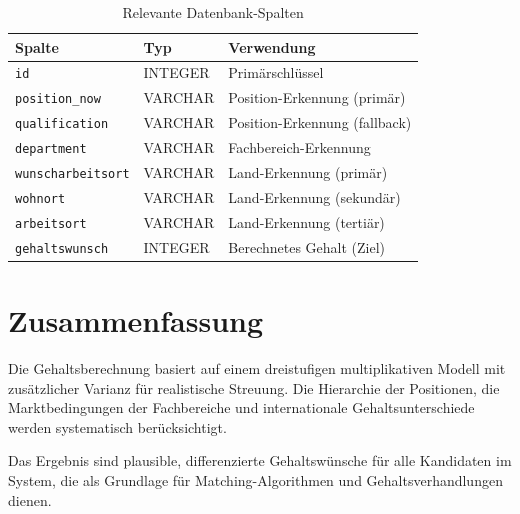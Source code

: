 \documentclass[12pt,a4paper]{article}
\begin{document}
\begin{table}[h]
\centering
\begin{tabular}{@{}lll@{}}
\toprule
\textbf{Spalte} & \textbf{Typ} & \textbf{Verwendung} \\
\midrule
\texttt{id} & INTEGER & Primärschlüssel \\
\texttt{position\_now} & VARCHAR & Position-Erkennung (primär) \\
\texttt{qualification} & VARCHAR & Position-Erkennung (fallback) \\
\texttt{department} & VARCHAR & Fachbereich-Erkennung \\
\texttt{wunscharbeitsort} & VARCHAR & Land-Erkennung (primär) \\
\texttt{wohnort} & VARCHAR & Land-Erkennung (sekundär) \\
\texttt{arbeitsort} & VARCHAR & Land-Erkennung (tertiär) \\
\texttt{gehaltswunsch} & INTEGER & Berechnetes Gehalt (Ziel) \\
\bottomrule
\end{tabular}
\caption{Relevante Datenbank-Spalten}
\label{tab:db_schema}
\end{table}

\section{Zusammenfassung}

Die Gehaltsberechnung basiert auf einem dreistufigen multiplikativen Modell mit zusätzlicher Varianz für realistische Streuung. Die Hierarchie der Positionen, die Marktbedingungen der Fachbereiche und internationale Gehaltsunterschiede werden systematisch berücksichtigt.

Das Ergebnis sind plausible, differenzierte Gehaltswünsche für alle Kandidaten im System, die als Grundlage für Matching-Algorithmen und Gehaltsverhandlungen dienen.
\end{document}
